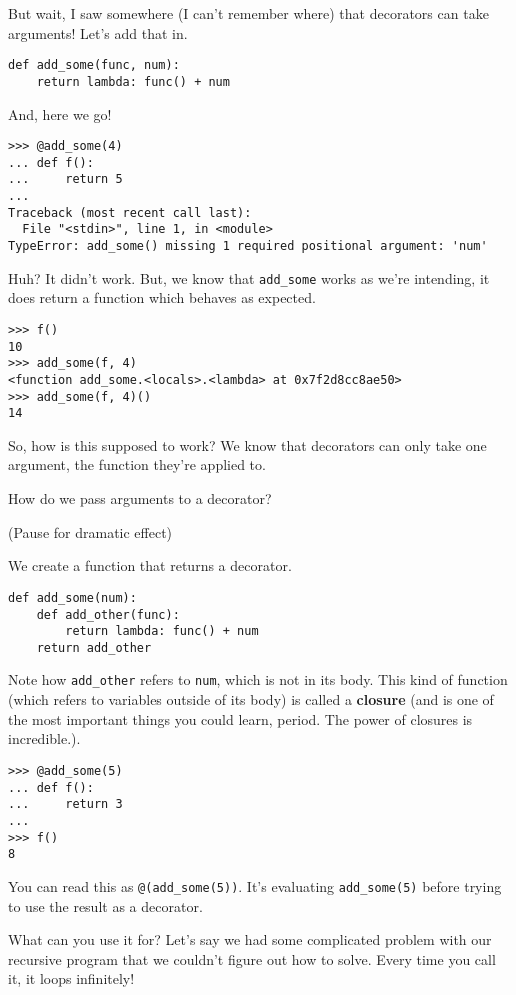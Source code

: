 \documentclass[11pt]{article}
\begin{document}
But wait, I saw somewhere (I can't remember where) that decorators
can take arguments! Let's add that in.
\begin{verbatim}
def add_some(func, num):
    return lambda: func() + num 
\end{verbatim}
And, here we go!
\begin{verbatim}
>>> @add_some(4)
... def f():
...     return 5
... 
Traceback (most recent call last):
  File "<stdin>", line 1, in <module>
TypeError: add_some() missing 1 required positional argument: 'num'
\end{verbatim}

Huh? It didn't work. But, we know that \texttt{add\_some} works as we're
intending, it does return a function which behaves as expected.
\begin{verbatim}
>>> f()
10
>>> add_some(f, 4)
<function add_some.<locals>.<lambda> at 0x7f2d8cc8ae50>
>>> add_some(f, 4)()
14
\end{verbatim}

So, how is this supposed to work? We know that decorators can only
take one argument, the function they're applied to.

How do we pass arguments to a decorator?

(Pause for dramatic effect)

We create a function that returns a decorator.
\begin{verbatim}
def add_some(num):
    def add_other(func):
        return lambda: func() + num 
    return add_other
\end{verbatim}
Note how \texttt{add\_other} refers to \texttt{num}, which is not in its body.
This kind of function (which refers to variables outside of its
body) is called a \textbf{closure} (and is one of the most important things
you could learn, period. The power of closures is incredible.).
\begin{verbatim}
>>> @add_some(5)
... def f():
...     return 3
... 
>>> f()
8
\end{verbatim}
You can read this as \texttt{@(add\_some(5))}. It's evaluating \texttt{add\_some(5)}
before trying to use the result as a decorator.

What can you use it for? Let's say we had some complicated problem
with our recursive program that we couldn't figure out how to
solve. Every time you call it, it loops infinitely!
\end{document}
